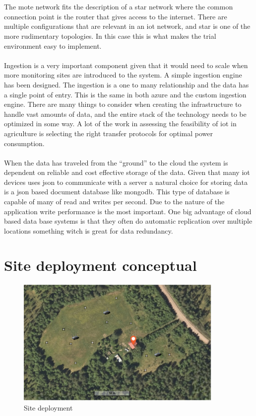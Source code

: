\documentclass[]{uiophd}
\begin{document}
\\\\
The mote network fits the description of a star network where the common connection point is the router that gives access to the internet. There are multiple configurations that are relevant in an iot network, and star is one of the more rudimentary topologies. In this case this is what makes the trial environment easy to implement.
\\\\
Ingestion is a very important component given that it would need to scale when more monitoring sites are introduced to the system. A simple ingestion engine has been designed. The ingestion is a one to many relationship and the data has a single point of entry. This is the same in both azure and the custom ingestion engine. There are many things to consider when creating the infrastructure to handle vast amounts of data, and the entire stack of the technology needs to be optimized in some way. A lot of the work in assessing the feasibility of iot in agriculture is selecting the right transfer protocols for optimal power consumption.
\\\\
 When the data has traveled from the “ground” to the cloud the system is dependent on reliable and cost effective storage of the data. Given that many iot devices uses json to communicate with a server a natural choice for storing data is a json based document database like mongodb. This type of database is capable of many of read and writes per second. Due to the nature of the application write performance is the most important. One big advantage of cloud based data base systems is that they often do automatic replication over multiple locations something witch is great for data redundancy.
 
 \section{Site deployment conceptual}
 \begin{figure}[h]
\caption{Site deployment}
\centering
\includegraphics[width=10cm]{hjemly.png}
\end{figure}
\end{document}
